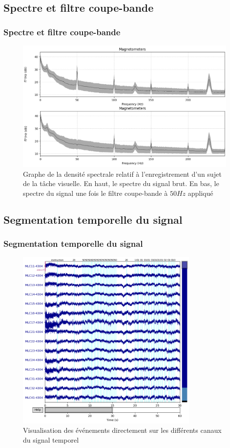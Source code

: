 \documentclass{beamer}
\begin{document}
\subsection{Spectre et filtre coupe-bande}
\begin{frame}
\frametitle{Spectre et filtre coupe-bande}
\begin{figure}[!ht]
    \centering
    \includegraphics[width=11cm]{spectre_effet_coupe_bande.png}
    \caption{Graphe de la densité spectrale relatif à l'enregistrement d'un sujet de la tâche visuelle. En haut, le spectre du signal brut. En bas, le spectre du signal une fois le filtre coupe-bande à $50 Hz$ appliqué}
    \label{fig3.4}
\end{figure}
\end{frame}

\subsection{Segmentation temporelle du signal}

\begin{frame}
\frametitle{Segmentation temporelle du signal}
\begin{figure}[!ht]
    \centering
    \includegraphics[width=09cm]{events_temporel.png}
    \caption{Visualisation des événements directement sur les différents canaux du signal temporel}
    \label{fig3.6}
\end{figure} 
\end{frame}
\end{document}

